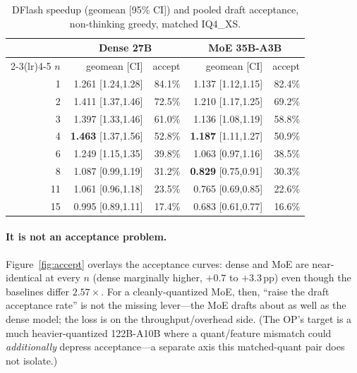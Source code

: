 \documentclass[11pt]{article}
\begin{document}
\begin{table}[h]
\centering\small
\caption{DFlash speedup (geomean [95\% CI]) and pooled draft acceptance, non-thinking greedy, matched IQ4\_XS.}
\begin{tabular}{r rr rr}
\toprule
& \multicolumn{2}{c}{Dense 27B} & \multicolumn{2}{c}{MoE 35B-A3B}\\
\cmidrule(lr){2-3}\cmidrule(lr){4-5}
$n$ & geomean [CI] & accept & geomean [CI] & accept\\
\midrule
1  & 1.261 [1.24,1.28] & 84.1\% & 1.137 [1.12,1.15] & 82.4\%\\
2  & 1.411 [1.37,1.46] & 72.5\% & 1.210 [1.17,1.25] & 69.2\%\\
3  & 1.397 [1.33,1.46] & 61.0\% & 1.136 [1.08,1.19] & 58.8\%\\
4  & \textbf{1.463} [1.37,1.56] & 52.8\% & \textbf{1.187} [1.11,1.27] & 50.9\%\\
6  & 1.249 [1.15,1.35] & 39.8\% & 1.063 [0.97,1.16] & 38.5\%\\
8  & 1.087 [0.99,1.19] & 31.2\% & \textbf{0.829} [0.75,0.91] & 30.3\%\\
11 & 1.061 [0.96,1.18] & 23.5\% & 0.765 [0.69,0.85] & 22.6\%\\
15 & 0.995 [0.89,1.11] & 17.4\% & 0.683 [0.61,0.77] & 16.6\%\\
\bottomrule
\end{tabular}
\label{tab:main}
\end{table}

\paragraph{It is not an acceptance problem.} Figure~\ref{fig:accept} overlays the acceptance curves: dense and MoE are
near-identical at every $n$ (dense marginally higher, $+0.7$ to $+3.3$\,pp) even though the baselines differ $2.57\times$. For a
cleanly-quantized MoE, then, ``raise the draft acceptance rate'' is not the missing lever---the MoE drafts about as well as the dense
model; the loss is on the throughput/overhead side. (The OP's target is a much heavier-quantized 122B-A10B where a quant/feature
mismatch could \emph{additionally} depress acceptance---a separate axis this matched-quant pair does not isolate.)
\end{document}
